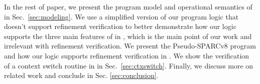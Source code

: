 In the rest of paper,
we present the program model
and operational semantics of \sparc{} in Sec.~\ref{sec:modeling}.
We use a 
simplified version of our program logic that
doesn't support refinement verification to better
demonstrate how our logic supports the three main 
features of \sparc{} in \Sec{\ref{sec:logic}}, 
which is the main point 
of our work and irrelevant with 
refinement verification. 
We present the Pseudo-SPARCv8 program and how 
our logic supports refinement verification
in \Sec{\ref{sec:refine-verification-sparc}}.  
We show the verification of a context switch routine
in \sparc{} in Sec.~\ref{sec:ctxswitch}.
Finally, we discuss more on
related work and conclude in Sec. \ref{sec:conclusion}.
